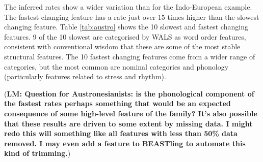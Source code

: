 \documentclass[twocolumn,10pt]{scrartcl}
\begin{document}
The inferred rates show a wider variation than for the Indo-European example.  The fastest changing feature has a rate just over 15 times higher than the slowest changing feature.  Table \ref{tab:austro} shows the 10 slowest and fastest changing features.  9 of the 10 slowest are categorised by WALS as word order features, consistent with conventional wisdom that these are some of the most stable structural features.  The 10 fastest changing features come from a wider range of categories, but the most common are nominal categories and phonology (particularly features related to stress and rhythm).

(\textbf{LM: Question for Austronesianists: is the phonological component of the fastest rates perhaps something that would be an expected consequence of some high-level feature of the family?  It's also possible that these results are driven to some extent by missing data.  I might redo this will something like all features with less than 50\% data removed.  I may even add a feature to BEASTling to automate this kind of trimming.})
\end{document}

